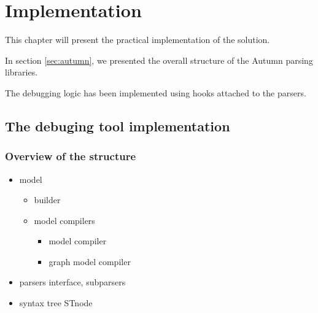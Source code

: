 %
\chapter{Implementation}
\label{chap:impl}
%
	This chapter will present the practical implementation of the solution.

	In section \ref{sec:autumn}, we presented the overall structure of the Autumn parsing libraries. 

	The debugging logic has been implemented using hooks attached to the parsers.

\section{The debuging tool implementation}
%

	\subsection{Overview of the structure}
%

	\begin{itemize}
		\item model
		\begin{itemize}
			\item builder
			\item model compilers
			\begin{itemize}
				\item model compiler
				\item graph model compiler
			\end{itemize}
		\end{itemize}
		\item parsers interface, subparsers
		\item syntax tree STnode
	\end{itemize}

